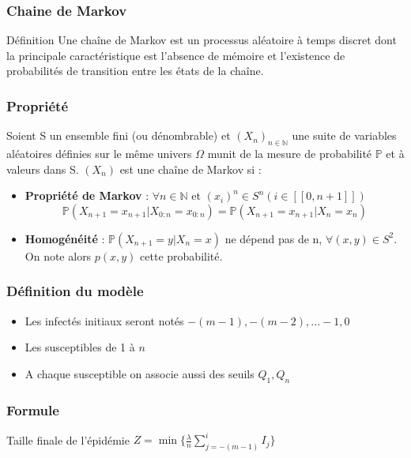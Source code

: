 \begin{frame}
    \frametitle{Chaine de Markov}

    \begin{block}{Définition}
        Une chaîne de Markov est un processus aléatoire à temps discret dont la principale caractéristique est l’absence de mémoire et l’existence de probabilités de transition entre les états de la chaîne.
    \end{block}
\end{frame}

\begin{frame}
    \frametitle{Propriété}

        Soient S un ensemble fini (ou dénombrable) et $(X_n)_{n \in \mathbb{N}}$ une suite de variables aléatoires définies sur le même univers $\Omega$ munit de la mesure de probabilité $\mathbb{P}$ et à valeurs dans S. $(X_n)$ est une chaîne de Markov  si :

        \begin{itemize}
            \item \textbf{Propriété de Markov} : $\forall n \in \mathbb{N}$ et $(x_i)^n \in S^n (i \in [[0, n+1]])$ \\
            $$ \mathbb{P}(X_{n+1} = x_{n+1} | X_{0:n} = x_{0:n}) = \mathbb{P}(X_{n+1} = x_{n+1} | X_n = x_n) $$
            \item \textbf{Homogénéité} : $\mathbb{P}(X_{n+1} = y | X_n = x)$ ne dépend pas de n, $\forall (x, y) \in S^2$. On note alors $p(x, y)$ cette probabilité.
        \end{itemize}
\end{frame}

\begin{frame}
	\frametitle{Définition du modèle}
	\begin{itemize}
	\item Les infectés initiaux seront notés $-(m-1), -(m-2), ...  -1, 0$
	\item Les susceptibles de 1 à $n$
	\item  A chaque susceptible on associe aussi des seuils $Q_1, Q_n$
	\end{itemize}
\end{frame}

\begin{frame}
	\frametitle{Formule}
	
	\begin{block}{Taille finale de l'épidémie}
          $ Z = \min \{\frac{\lambda}{n} \sum^i_{j = - (m-1)} I_j \} $
	\end{block}

\end{frame}

